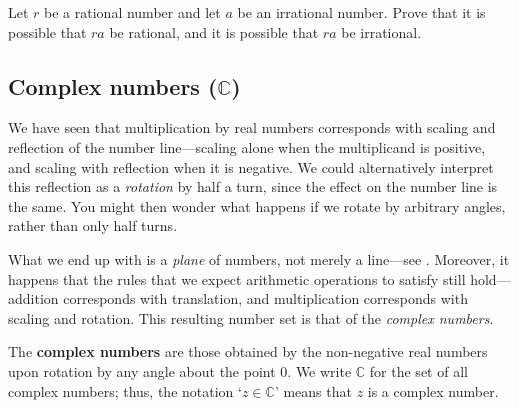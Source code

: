 \begin{exercise}
Let $r$ be a rational number and let $a$ be an irrational number. Prove that it is possible that $ra$ be rational, and it is possible that $ra$ be irrational.
\end{exercise}


\subsection*{Complex numbers ($\mathbb{C}$)}

We have seen that multiplication by real numbers corresponds with scaling and reflection of the number line---scaling alone when the multiplicand is positive, and scaling with reflection when it is negative. We could alternatively interpret this reflection as a \textit{rotation} by half a turn, since the effect on the number line is the same. You might then wonder what happens if we rotate by arbitrary angles, rather than only half turns.

What we end up with is a \textit{plane} of numbers, not merely a line---see . Moreover, it happens that the rules that we expect arithmetic operations to satisfy still hold---addition corresponds with translation, and multiplication corresponds with scaling and rotation. This resulting number set is that of the \textit{complex numbers}.

\begin{definition}
\label{defComplexNumbersInformal}
The \textbf{complex numbers} are those obtained by the non-negative real numbers upon rotation by any angle about the point $0$. We write $\mathbb{C}$  for the set of all complex numbers; thus, the notation `$z \in \mathbb{C}$' means that $z$ is a complex number.
\end{definition}

